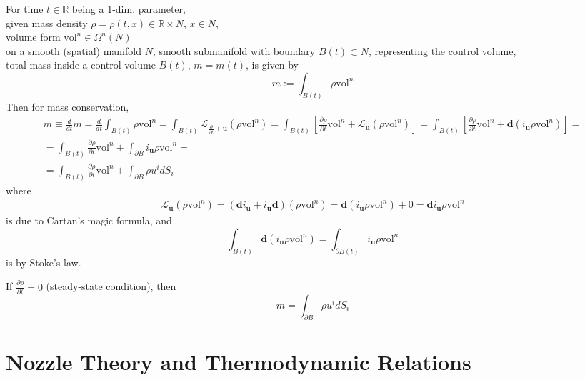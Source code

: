 \documentclass[10pt]{amsart}
\begin{document}
\begin{multicols*}{2}
For time $t\in \mathbb{R}$ being a 1-dim. parameter, \\
given mass density $\rho = \rho(t,x) \in \mathbb{R} \times N$, $x\in N$, \\
volume form $\text{vol}^n\in \Omega^n(N)$ \\
on a smooth (spatial) manifold $N$, smooth submanifold with boundary $B(t) \subset N$, representing the control volume, \\
total mass inside a control volume $B(t)$, $m=m(t)$, is given by 
\[
m := \int_{B(t)} \rho \text{vol}^n
\]
Then for mass conservation,
\begin{equation}\label{Eq:MassConservationDerivation}
\begin{gathered}
\dot{m} \equiv \frac{d}{dt} m = \frac{d}{dt} \int_{B(t)} \rho \text{vol}^n = \int_{B(t)} \mathcal{L}_{\frac{\partial}{\partial t} + \mathbf{u}} (\rho \text{vol}^n) = \int_{B(t)} \left[ \frac{ \partial \rho }{ \partial t} \text{vol}^n + \mathcal{L}_{\mathbf{u}} (\rho \text{vol}^n) \right] = \int_{B(t)} \left[ \frac{ \partial \rho }{ \partial t} \text{vol}^n + \mathbf{d}(i_{\mathbf{u}} \rho \text{vol}^n) \right] = \\ 
 = \int_{B(t)} \frac{ \partial \rho }{ \partial t} \text{vol}^n + \int_{\partial B} i_{\mathbf{u}} \rho \text{vol}^n = \\
 = \int_{B(t)} \frac{ \partial \rho }{ \partial t} \text{vol}^n + \int_{\partial B}\rho u^i dS_i 
\end{gathered}
\end{equation}
where 
\[
\begin{gathered}
\mathcal{L}_{\mathbf{u}} (\rho \text{vol}^n ) = (\mathbf{d} i_{\mathbf{u}} + i_{\mathbf{u}} \mathbf{d}) (\rho \text{vol}^n) = \mathbf{d}(i_{\mathbf{u}} \rho \text{vol}^n) + 0 = \mathbf{d}i_{\mathbf{u}} \rho \text{vol}^n
\end{gathered} 
\]
is due to Cartan's magic formula, and 
\[
\int_{B(t)} \mathbf{d} (i_{\mathbf{u}} \rho \text{vol}^n) = \int_{\partial B(t)} i_{\mathbf{u}} \rho \text{vol}^n
\]
is by Stoke's law.


If $\frac{ \partial \rho }{ \partial t} = 0$ (steady-state condition), then
\[
\dot{m} = \int_{\partial B} \rho u^i dS_i
\]



\section{Nozzle Theory and Thermodynamic Relations}


\end{multicols*}
\end{document}
